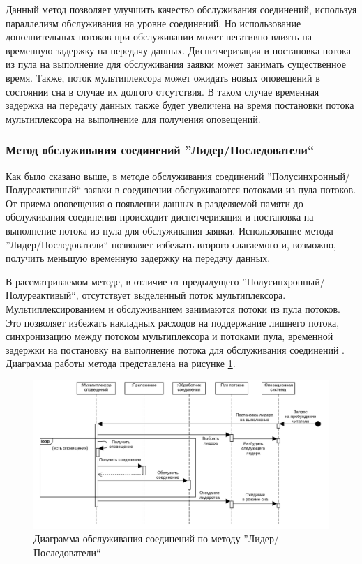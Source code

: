 Данный метод позволяет улучшить качество обслуживания соединений, используя параллелизм обслуживания на уровне соединений. Но использование дополнительных потоков при обслуживании может негативно влиять на временную задержку на передачу данных. Диспетчеризация и постановка потока из пула на выполнение для обслуживания заявки может занимать существенное время.
Также, поток мультиплексора может ожидать новых оповещений в состоянии сна в случае их долгого отсутствия. В таком случае временная задержка на передачу данных также будет увеличена на время постановки потока мультиплексора на выполнение для получения оповещений.

\subsubsection{Метод обслуживания соединений ''Лидер/Последователи``}\label{chapter31:BlockingLF}

Как было сказано выше, в методе обслуживания соединений ''Полусинхронный/Полуреактивный`` заявки в соединении обслуживаются потоками из пула потоков. От приема оповещения о появлении данных в разделяемой памяти до обслуживания соединения происходит диспетчеризация и постановка на выполнение потока из пула для обслуживания заявки. Использование метода ''Лидер/Последователи`` \cite{schmidt1998leader} позволяет избежать второго слагаемого и, возможно, получить меньшую временную задержку на передачу данных.

В рассматриваемом методе, в отличие от предыдущего ''Полусинхронный/Полуреактивый``, отсутствует выделенный поток мультиплексора. Мультиплексированием и обслуживанием занимаются потоки из пула потоков. Это позволяет избежать накладных расходов на поддержание лишнего потока, синхронизацию между потоком мультиплексора и потоками пула, временной задержки на постановку на выполнение потока для обслуживания соединений \cite[41]{POSA2}. Диаграмма работы метода представлена на рисунке \ref{chapter31:LFMuxSchema}.

\begin{figure}[!h]
\caption{Диаграмма обслуживания соединений по методу ''Лидер/Последователи``}
\label{chapter31:LFMuxSchema}
\includegraphics[width=\textwidth]{../../graphics/schemes/LFMuxSequence}
\end{figure}

